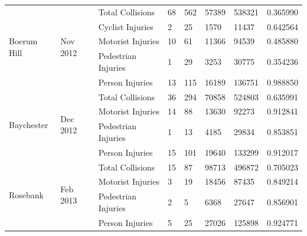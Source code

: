 \documentclass[10pt,journal,compsoc]{IEEEtran}
\begin{document}
\begin{table}[]
\begin{tabular}{|l|l|l|l|l|l|l|l|}
\multirow{5}{*}{Boerum Hill}                   & \multirow{5}{*}{Nov 2012} & Total Collisions    & 68        & 562      & 57389      & 538321    & 0.365990 \\ \cline{3-8} 
                                               &                             & Cyclist Injuries    & 2         & 25       & 1570       & 11437     & 0.642564 \\ \cline{3-8} 
                                               &                             & Motorist Injuries   & 10        & 61       & 11366      & 94539     & 0.485880 \\ \cline{3-8} 
                                               &                             & Pedestrian Injuries & 1         & 29       & 3253       & 30775     & 0.354236 \\ \cline{3-8} 
                                               &                             & Person Injuries     & 13        & 115      & 16189      & 136751    & 0.988850 \\ \hline
\multirow{4}{*}{Baychester}                    & \multirow{4}{*}{Dec 2012} & Total Collisions    & 36        & 294      & 70858      & 524803    & 0.635991 \\ \cline{3-8} 
                                               &                             & Motorist Injuries   & 14        & 88       & 13630      & 92273     & 0.912841 \\ \cline{3-8} 
                                               &                             & Pedestrian Injuries & 1         & 13       & 4185       & 29834     & 0.853851 \\ \cline{3-8} 
                                               &                             & Person Injuries     & 15        & 101      & 19640      & 133299    & 0.912017 \\ \hline
\multirow{4}{*}{Rosebank}                      & \multirow{4}{*}{Feb 2013} & Total Collisions    & 15        & 87       & 98713      & 496872    & 0.705023 \\ \cline{3-8} 
                                               &                             & Motorist Injuries   & 3         & 19       & 18456      & 87435     & 0.849214 \\ \cline{3-8} 
                                               &                             & Pedestrian Injuries & 2         & 5        & 6368       & 27647     & 0.856901 \\ \cline{3-8} 
                                               &                             & Person Injuries     & 5         & 25       & 27026      & 125898    & 0.924771 \\ \hline

\end{tabular}
\end{table}
\end{document}
